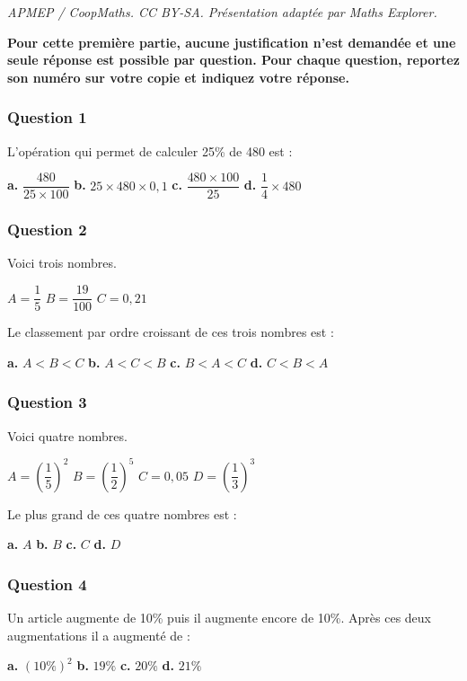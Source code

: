 \documentclass[10pt]{article}
\begin{document}
\noindent\textit{APMEP / CoopMaths. CC BY-SA. Présentation adaptée par Maths Explorer.}\par\medskip
\textbf{Pour cette première partie, aucune justification n'est demandée et une seule réponse est possible par question. Pour chaque question, reportez son numéro sur votre copie et indiquez votre réponse.}

\subsubsection*{Question 1}
L'opération qui permet de calculer 25\% de 480 est :

\textbf{a.} $\dfrac{480}{25 \times 100}$ \hfill \textbf{b.} $25 \times 480 \times 0,1$ \hfill 
\textbf{c.} $\dfrac{480 \times 100}{25}$ \hfill \textbf{d.} $\dfrac{1}{4} \times 480$

\subsubsection*{Question 2}
Voici trois nombres.

$A = \dfrac{1}{5}$ \hfill $B = \dfrac{19}{100}$ \hfill $C = 0,21$

Le classement par ordre croissant de ces trois nombres est :

\textbf{a.} $A < B < C$ \hfill \textbf{b.} $A < C < B$ \hfill 
\textbf{c.} $B < A < C$ \hfill \textbf{d.} $C < B < A$

\subsubsection*{Question 3}
Voici quatre nombres.

$A = \left(\dfrac{1}{5}\right)^2$ \hfill $B = \left(\dfrac{1}{2}\right)^5$ \hfill $C = 0,05$ \hfill $D = \left(\dfrac{1}{3}\right)^3$

Le plus grand de ces quatre nombres est :

\textbf{a.} $A$ \hfill \textbf{b.} $B$ \hfill \textbf{c.} $C$ \hfill \textbf{d.} $D$

\subsubsection*{Question 4}
Un article augmente de 10\% puis il augmente encore de 10\%. Après ces deux augmentations il a augmenté de :

\textbf{a.} $(10\%)^2$ \hfill \textbf{b.} $19\%$ \hfill \textbf{c.} $20\%$ \hfill \textbf{d.} $21\%$
\end{document}
